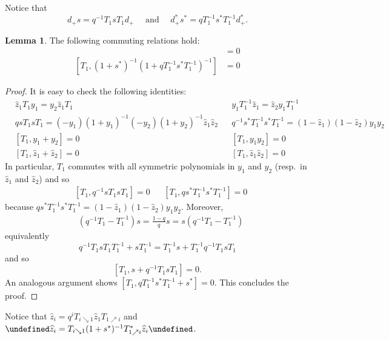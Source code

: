 \documentclass[reqno]{amsart}
\theoremstyle{plain}
\theoremstyle{definition}
\newtheorem{lemma}[theorem]{Lemma}
\theoremstyle{remark}
\newcommand{\z}{\widehat{z}}
\let\oldTheta\Theta
\let\Theta\undefined
\DeclareMathOperator{\Theta}{\oldTheta}
\newcommand{\<}{\langle}
\renewcommand{\>}{\rangle}
\begin{document}
Notice that
\begin{equation}
    d_+ s = q^{-1} T_1 s T_1 d_+ \quad \text{ and } \quad d_+^* s^* = q T_1^{-1} s^* T_1^{-1} d_+^*.
\end{equation}

\begin{lemma}
    The following commuting relations hold:
    \begin{align}
        [T_1, (1-s)(1 - q^{-1} T_1 s T_1)] & = 0 \label{eq:T_comm} \\
        [T_1, (1+s^*)^{-1}(1 + q T_1^{-1} s^* T_1^{-1})^{-1}] & = 0 \label{eq:T_comm*}
    \end{align}
\end{lemma}

\begin{proof}
It is easy to check the following identities:
    \begin{align}
        & \z_1 T_1 y_1 = y_2 \z_1 T_1 & & y_1 T_1^{-1} \z_1 = \z_2 y_1 T_1^{-1} \label{eq:z1_y1_comm} \\
        & q s T_1 s T_1 = (-y_1) (1+y_1)^{-1} (-y_2)(1+y_2)^{-1} \z_1 \z_2 & & q^{-1} s^* T_1^{-1} s^* T_1^{-1} = (1 - \z_1) (1 - \z_2) y_1 y_2 \\
        & [T_1, y_1+y_2] = 0 & & [T_1, y_1 y_2] = 0 \label{eq:T1_symy_comm} \\
        & [T_1, \z_1+\z_2] = 0 & & [T_1, \z_1 \z_2] = 0 \label{eq:T1_symz_comm}
    \end{align}
    In particular, $T_1$ commutes with all symmetric polynomials in $y_1$ and $y_2$ (resp.\ in $\z_1$ and $\z_2$) and so 
    \begin{align*}
        & [T_1, q^{-1} s T_1 s T_1] = 0 &&  [T_1, q s^* T_1^{-1} s^* T_1^{-1}] = 0
    \end{align*}
    because $q s^* T_1^{-1} s^* T_1^{-1} = (1-\z_1)(1-\z_2)y_1y_2$.
    Moreover,
    \begin{align*}
        & (q^{-1}T_1-T_1^{-1})s = \frac{1-q}{q} s = s(q^{-1}T_1-T_1^{-1})
    \end{align*}
    equivalently
    \[q^{-1} T_1 s T_1 T_1^{-1} + s T_1^{-1} = T_1^{-1} s + T_1^{-1} q^{-1} T_1 s T_1 \]
    and so
    \[ [T_1, s + q^{-1} T_1 s T_1] = 0. \]
    An analogous argument shows $[T_1, q T_1^{-1} s^* T_1^{-1} + s^*] = 0$.
    This concludes the proof.
\end{proof}

Notice that $\z_i= q^i T_{i \searrow 1} \z_1  T_{1 \nearrow i}$ and $\Theta \z_i = T_{i \searrow 1} (1+s^*)^{-1} T_{1 \nearrow i}^* \z_i \Theta$.
\end{document}
